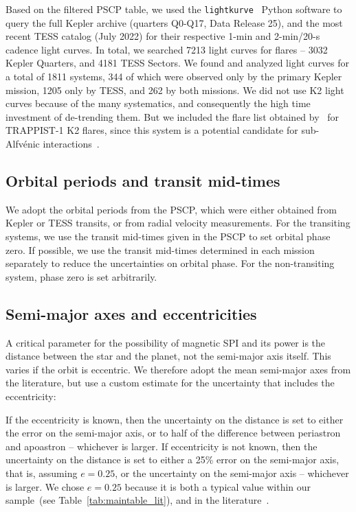 \documentclass[twocolumn]{aastex631}
\begin{document}
Based on the filtered PSCP table, we used the \texttt{lightkurve}~\citep{lightkurvecollaboration2018lightkurve} Python software to query the full Kepler archive (quarters Q0-Q17, Data Release 25), and the most recent TESS catalog (July 2022) for their respective 1-min and 2-min/20-s cadence light curves. In total, we searched 7213 light curves for flares -- 3032 Kepler Quarters, and 4181 TESS Sectors. We found and analyzed light curves for a total of 1811 systems, 344 of which were observed only by the primary Kepler mission, 1205 only by TESS, and 262 by both missions. We did not use K2 light curves because of the many systematics, and consequently the high time investment of de-trending them. But we included the flare list obtained by~\citet{paudel2018k2} for TRAPPIST-1 K2 flares, since this system is a potential candidate for sub-Alfv\'enic interactions~\citep{fischer2019timevariable}.

\subsection{Orbital periods and transit mid-times}
\label{sec:data:orbitalperiod}
We adopt the orbital periods from the PSCP, which were either obtained from Kepler or TESS transits, or from radial velocity measurements. For the transiting systems, we use the transit mid-times given in the PSCP to set orbital phase zero. If possible, we use the transit mid-times determined in each mission separately to reduce the uncertainties on orbital phase. For the non-transiting system, phase zero is set arbitrarily.
\subsection{Semi-major axes and eccentricities}
\label{sec:data:a}
A critical parameter for the possibility of magnetic SPI and its power is the distance between the star and the planet, not the semi-major axis itself. This varies if the orbit is eccentric. We therefore adopt the mean semi-major axes from the literature, but use a custom estimate for the uncertainty that includes the eccentricity:

If the eccentricity is known, then the uncertainty on the distance is set to either the error on the semi-major axis, or to half of the difference between periastron and apoastron -- whichever is larger. If eccentricity is not known, then the uncertainty on the distance is set to either a 25\% error on the semi-major axis, that is, assuming $e=0.25$, or the uncertainty on the semi-major axis -- whichever is larger. We chose $e=0.25$ because it is both a typical value within our sample~(see Table~\ref{tab:maintable_lit}), and in the literature~\citep{eylen2019orbital}.
\end{document}
